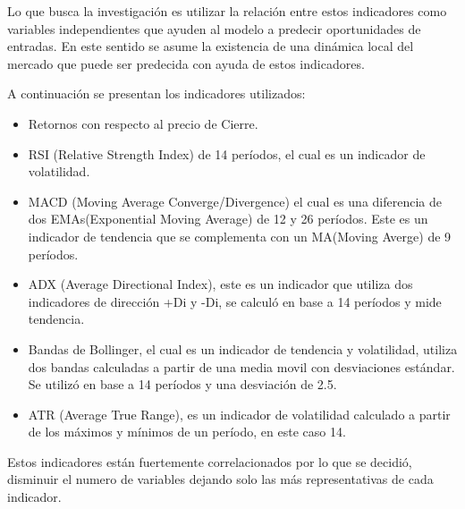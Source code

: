 \documentclass[a4paper,12pt]{Latex/Classes/PhDthesisPSnPDF}
\begin{document}
Lo que busca la investigación es utilizar la relación entre estos indicadores como variables independientes que ayuden al modelo a predecir oportunidades de entradas. En este sentido se asume la existencia de una dinámica local del mercado que puede ser predecida con ayuda de estos indicadores.

A continuación se presentan los indicadores utilizados:

\begin{itemize}
\item Retornos con respecto al precio de Cierre.
\item RSI (Relative Strength Index) de 14 períodos, el cual es un indicador de volatilidad.
\item MACD (Moving Average Converge/Divergence) el cual es una diferencia de dos EMAs(Exponential Moving Average) de 12 y 26 períodos. Este es un indicador de tendencia que se complementa con un MA(Moving Averge) de 9 períodos. 
\item ADX (Average Directional Index), este es un indicador que utiliza dos indicadores de dirección +Di y -Di, se calculó en base a 14 períodos y mide tendencia.
\item Bandas de Bollinger, el cual es un indicador de tendencia y volatilidad, utiliza dos bandas calculadas a partir de una media movil con desviaciones estándar. Se utilizó en base a 14 períodos y una desviación de 2.5.
\item ATR (Average True Range), es un indicador de volatilidad calculado a partir de los máximos y mínimos de un período, en este caso 14.
\end{itemize}

Estos indicadores están fuertemente correlacionados por lo que se decidió, disminuir el numero de variables dejando solo las más representativas de cada indicador.
\end{document}
